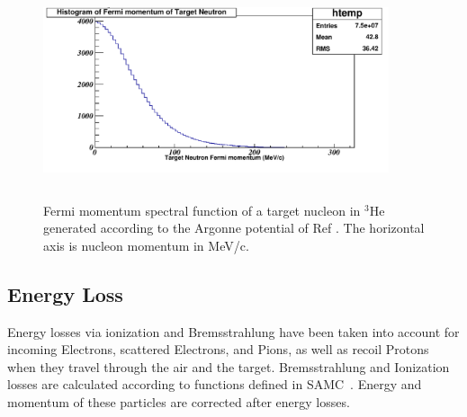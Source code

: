 \begin{figure}[!hbt]
    \centering
    \includegraphics[width=4.0in,height=2.5in]{./figures/Fermi.pdf}
    \caption{Fermi momentum spectral function of a target nucleon in $^3$He generated according to the Argonne 
    potential of Ref \cite{fermipaper}.  The horizontal axis is nucleon momentum in MeV/c.}
    \label{fig:fermi}
\end{figure}
\subsection{Energy Loss}
Energy losses via ionization and Bremsstrahlung have been taken into account for incoming Electrons, scattered Electrons, and Pions, as well as
recoil Protons when they travel through the air and the target. Bremsstrahlung and Ionization losses are calculated according to functions defined in SAMC~\cite{samc}. 
Energy and momentum of these particles are corrected after energy losses.